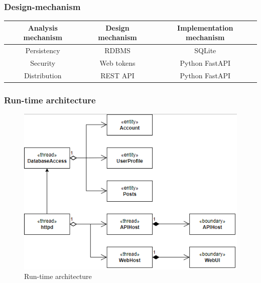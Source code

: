\documentclass[a4paper]{article}
\begin{document}
\subsubsection{Design-mechanism}
\begin{center}
    \begin{tabular} { | c | c | c |}
        \hline
        \textbf{Analysis mechanism} & \textbf{Design mechanism} & \textbf{Implementation mechanism} \\
        \hline
        Persistency & RDBMS & SQLite \\
        \hline
        Security & Web tokens & Python FastAPI \\
        \hline
        Distribution & REST API & Python FastAPI \\
        \hline
    \end{tabular}
\end{center}

\subsubsection{Run-time architecture}
\begin{figure}[H]
    \centering
    \includegraphics[width=1.0\textwidth]{runtime_architecture.png}
    \caption{Run-time architecture}
    \label{fig:fig36}
\end{figure}
\end{document}
